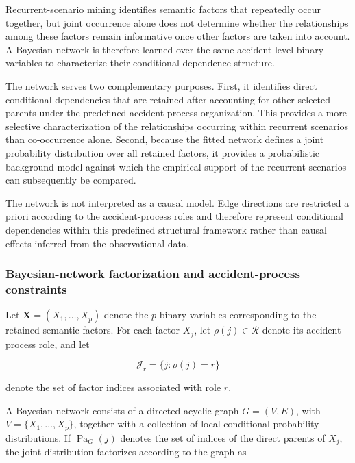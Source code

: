 Recurrent-scenario mining identifies semantic factors that repeatedly occur
together, but joint occurrence alone does not determine whether the
relationships among these factors remain informative once other factors are
taken into account. A Bayesian network is therefore learned over the same
accident-level binary variables to characterize their conditional dependence
structure.

The network serves two complementary purposes. First, it identifies direct
conditional dependencies that are retained after accounting for other selected
parents under the predefined accident-process organization. This provides a
more selective characterization of the relationships occurring within
recurrent scenarios than co-occurrence alone. Second, because the fitted
network defines a joint probability distribution over all retained factors, it
provides a probabilistic background model against which the empirical support
of the recurrent scenarios can subsequently be compared.

The network is not interpreted as a causal model. Edge directions are
restricted a priori according to the accident-process roles and therefore
represent conditional dependencies within this predefined structural
framework rather than causal effects inferred from the observational data.


\subsubsection{Bayesian-network factorization and accident-process constraints}
\label{sec:chap4_global_bn_factorization}

Let
\(\mathbf X=(X_1,\ldots,X_p)\)
denote the \(p\) binary variables corresponding to the retained semantic
factors. For each factor \(X_j\), let
\(\rho(j)\in\mathcal R\)
denote its accident-process role, and let

\[
\mathcal J_r
=
\{j:\rho(j)=r\}
\]

denote the set of factor indices associated with role \(r\).

A Bayesian network consists of a directed acyclic graph
\(G=(V,E)\), with \(V=\{X_1,\ldots,X_p\}\), together with a collection of
local conditional probability distributions. If
\(\operatorname{Pa}_G(j)\) denotes the set of indices of the direct parents
of \(X_j\), the joint distribution factorizes according to the graph as

